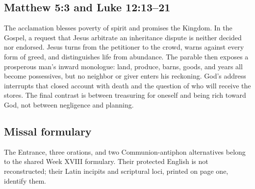 \subsection*{Matthew 5:3 and Luke 12:13--21}
The acclamation blesses poverty of spirit and promises the Kingdom. In the
Gospel, a request that Jesus arbitrate an inheritance dispute is neither
decided nor endorsed. Jesus turns from the petitioner to the crowd, warns
against every form of greed, and distinguishes life from abundance. The
parable then exposes a prosperous man's inward monologue: land, produce,
barns, goods, and years all become possessives, but no neighbor or giver enters
his reckoning. God's address interrupts that closed account with death and the
question of who will receive the stores. The final contrast is between
treasuring for oneself and being rich toward God, not between negligence and
planning.
\subsection*{Missal formulary}
The Entrance, three orations, and two Communion-antiphon alternatives belong
to the shared Week XVIII formulary. Their protected English is not reconstructed;
their Latin incipits and scriptural loci, printed on page one, identify them.
